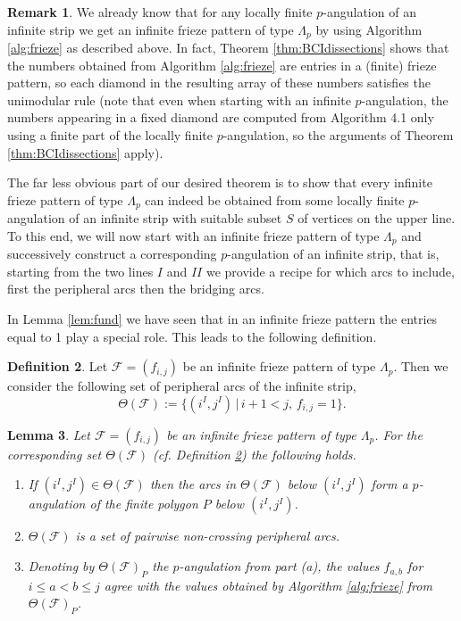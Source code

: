 \documentclass[11pt,a4paper]{amsart}
\newtheorem{Lemma}{Lemma}[section]
\theoremstyle{definition}
\newtheorem{Definition}[Lemma]{Definition}
\newtheorem{Remark}[Lemma]{Remark}
\numberwithin{equation}{section}
\begin{document}
\begin{Remark} \label{rem:pangulationtofrieze}
We already know that for any locally finite $p$-angulation of an infinite strip we get an infinite frieze pattern of type
$\Lambda_p$ by using Algorithm \ref{alg:frieze} as described above. In fact, 
Theorem \ref{thm:BCIdissections} shows that the numbers obtained from Algorithm \ref{alg:frieze} 
are entries in a (finite) frieze pattern, so each diamond in the resulting array of these numbers satisfies 
the unimodular rule (note that even when starting with an infinite $p$-angulation, the numbers appearing 
in a fixed diamond are computed from Algorithm 4.1 only using a finite part of the locally finite $p$-angulation, so
the arguments of Theorem \ref{thm:BCIdissections} apply).  
\end{Remark} 
\medskip

The far less obvious part of our desired theorem is to show that every infinite frieze pattern of type 
$\Lambda_p$ can indeed be obtained from some locally finite $p$-angulation of an infinite strip with suitable
subset $S$ of vertices on the upper line. 
To this end, we will now start with an infinite frieze pattern of type $\Lambda_p$ and successively construct a corresponding
$p$-angulation of an infinite strip, that is, starting from the two lines $I$ and $II$ we provide a recipe for
which arcs to include, first the peripheral arcs then the bridging arcs.  
\smallskip

In Lemma \ref{lem:fund} we have seen that in an infinite frieze pattern the entries equal to 1 
play a special role. This leads to the following definition. 

\begin{Definition} \label{def:theta}
Let $\mathcal{F}=(f_{i,j})$ be an infinite frieze pattern of type $\Lambda_p$. Then we consider the following 
set of peripheral arcs of the infinite strip,
$$\Theta(\mathcal{F}) := \{ (i^I,j^I)\,|\,i+1<j,\,f_{i,j}=1\}.
$$ 
\end{Definition}


\begin{Lemma} \label{lem:angulation}
Let $\mathcal{F}=(f_{i,j})$ be an infinite frieze pattern of type $\Lambda_p$. For the corresponding set $\Theta(\mathcal{F})$
(cf. Definition \ref{def:theta}) the following holds. 
\begin{enumerate}
\item[{(a)}] If $(i^I,j^I)\in \Theta(\mathcal{F})$ then the arcs in $\Theta(\mathcal{F})$ below 
$(i^I,j^I)$ form a $p$-angulation of the finite polygon $P$ below $(i^I,j^I)$.
\item[{(b)}] $\Theta(\mathcal{F})$ is a set of pairwise non-crossing peripheral arcs. 
\item[{(c)}] Denoting by $\Theta(\mathcal{F})_P$ the $p$-angulation from part (a), the values
$f_{a,b}$ for $i\le a<b\le j$ agree with the values obtained by Algorithm \ref{alg:frieze} from 
$\Theta(\mathcal{F})_P$.  
\end{enumerate}
\end{Lemma}
\end{document}
